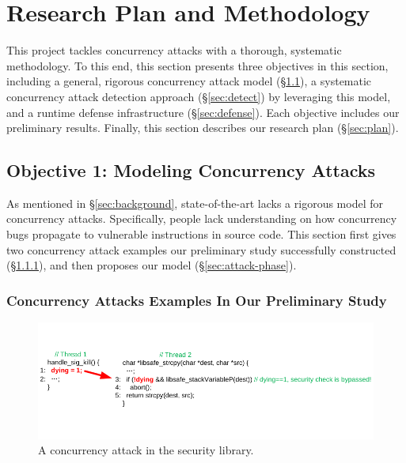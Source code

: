 \section{Research Plan and Methodology} \label{sec:rep}

This \xxx project tackles concurrency attacks with a thorough, systematic 
methodology. To this end, this section presents three objectives in this 
section, including a general, rigorous concurrency attack model 
(\S\ref{sec:model}), a systematic concurrency attack detection approach 
(\S\ref{sec:detect}) by leveraging this model, and a runtime defense 
infrastructure (\S\ref{sec:defense}). Each objective includes our preliminary 
results. Finally, this section describes our research plan (\S\ref{sec:plan}).

\vspace{-.15in}\subsection{Objective 1: Modeling Concurrency Attacks} 
\label{sec:model}\vspace{-.075in}

As mentioned in \S\ref{sec:background}, state-of-the-art lacks a rigorous model 
for concurrency attacks. Specifically, people lack understanding on how 
concurrency bugs propagate to vulnerable instructions in source code. This 
section first gives two concurrency attack examples our preliminary study 
successfully constructed (\S\ref{sec:examples}), and then proposes 
our model (\S\ref{sec:attack-phase}).

\vspace{-.15in}\subsubsection{Concurrency Attacks Examples In Our Preliminary 
Study} 
\label{sec:examples}\vspace{-.075in}

\begin{figure}[h]
\centering
\includegraphics[width=0.8\columnwidth]{figures/libsafe}
\vspace{-.05in}
\caption{{A concurrency attack in the \libsafe security library.}} 
\label{fig:libsafe}
\vspace{-.15in}
\end{figure}

